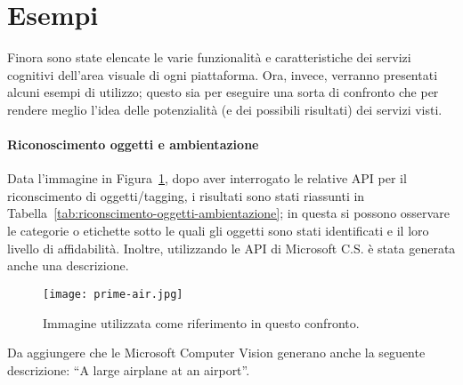 
\section{Esempi}\label{sec:esempi}
Finora sono state elencate le varie funzionalità e caratteristiche dei servizi cognitivi dell'area visuale di ogni piattaforma.
Ora, invece, verranno presentati alcuni esempi di utilizzo; questo sia per eseguire una sorta di confronto che per
rendere meglio l'idea delle potenzialità (e dei possibili risultati) dei servizi visti.
\paragraph{Riconoscimento oggetti e ambientazione}\label{par:riconscimento-oggetti-ambientazione}
Data l'immagine in Figura~\ref{fig:riconscimento-oggetti-ambientazione}, dopo aver interrogato le relative API per il riconscimento di oggetti/tagging,
i risultati sono stati riassunti in Tabella~\ref{tab:riconscimento-oggetti-ambientazione}; in questa si possono osservare le categorie o etichette sotto le quali
gli oggetti sono stati identificati e il loro livello di affidabilità.
Inoltre, utilizzando le API di Microsoft C.S. è stata generata anche una descrizione.
%
\begin{figure}[!h]
\begin{center}
	\texttt{[image: prime-air.jpg]}
{\scriptsize \caption{Immagine utilizzata come riferimento in questo confronto.}
\label{fig:riconscimento-oggetti-ambientazione}}
\end{center}
\end{figure}
%

Da aggiungere che le Microsoft Computer Vision generano anche la seguente descrizione: ``A large airplane at an airport''.

